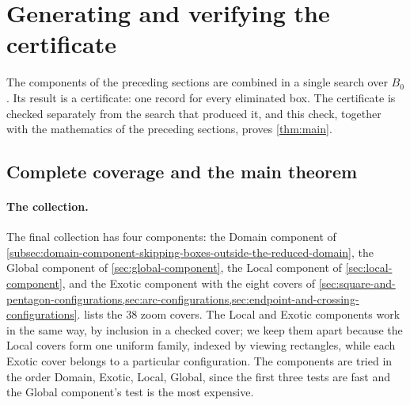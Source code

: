 \pagebreak[0]
\section{Generating and verifying the certificate}\label{sec:generating-and-verifying-the-certificate}

The components of the preceding sections are combined in a single search
over $B_0$. Its result is a certificate: one record for every eliminated
box. The certificate is checked separately from the search that produced
it, and this check, together with the mathematics of the preceding
sections, proves \cref{thm:main}.

\subsection{Complete coverage and the main theorem}\label{subsec:complete-coverage-and-the-main-theorem}

\paragraph{The collection.}
The final collection has four components: the Domain component of
\cref{subsec:domain-component-skipping-boxes-outside-the-reduced-domain},
the Global component of \cref{sec:global-component}, the Local component of
\cref{sec:local-component}, and the Exotic component with the eight
covers of \cref{sec:square-and-pentagon-configurations,sec:arc-configurations,sec:endpoint-and-crossing-configurations}.
 lists the 38 zoom covers. The Local and Exotic
components work in the same way, by inclusion in a checked cover; we keep
them apart because the Local covers form one uniform family, indexed by
viewing rectangles, while each Exotic cover belongs to a particular
configuration. The components are tried in the order Domain, Exotic,
Local, Global, since the first three tests are fast and the Global
component's test is the most expensive.

